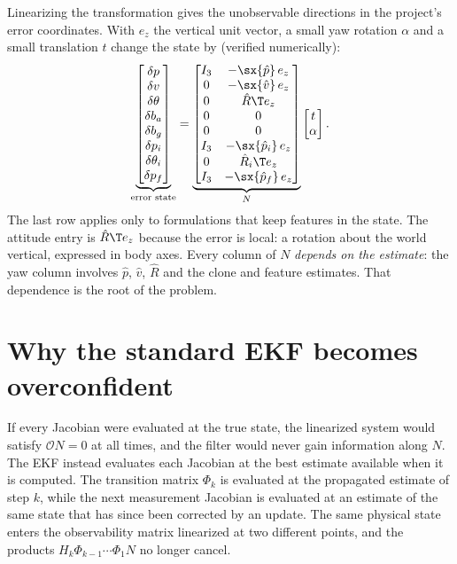 Linearizing the transformation gives the unobservable directions in the project's error coordinates. With $e_z$ the vertical
unit vector, a small yaw rotation $\alpha$ and a small translation $t$ change the state by (verified numerically):
\begin{equation}
  \underbrace{\begin{bmatrix} \delta p \\ \delta v \\ \delta\theta \\ \delta b_a \\ \delta b_g \\ \delta p_i \\ \delta\theta_i \\ \delta p_f \end{bmatrix}}_{\text{error state}}
  = \underbrace{\begin{bmatrix}
    I_3 & -\sx{\hat p}\,e_z \\
    0 & -\sx{\hat v}\,e_z \\
    0 & \hat R\T e_z \\
    0 & 0 \\
    0 & 0 \\
    I_3 & -\sx{\hat p_i}\,e_z \\
    0 & \hat R_i\T e_z \\
    I_3 & -\sx{\hat p_f}\,e_z
  \end{bmatrix}}_{N}
  \begin{bmatrix} t \\ \alpha \end{bmatrix}.
  \label{eq:nullspace-N}
\end{equation}
The last row applies only to formulations that keep features in the state. The attitude entry is $\hat R\T e_z$ because the error is
local: a rotation about the world vertical, expressed in body axes. Every column of $N$ \emph{depends on the estimate}: the yaw
column involves $\hat p$, $\hat v$, $\hat R$ and the clone and feature estimates. That dependence is the root of the problem.

\section{Why the standard EKF becomes overconfident}

If every Jacobian were evaluated at the true state, the linearized system would satisfy $\mathcal{O}N = 0$ at all times, and the
filter would never gain information along $N$. The EKF instead evaluates each Jacobian at the best estimate available when it is
computed. The transition matrix $\Phi_k$ is evaluated at the propagated estimate of step $k$, while the next measurement Jacobian is
evaluated at an estimate of the same state that has since been corrected by an update. The same physical state enters the
observability matrix linearized at two different points, and the products $H_{k}\Phi_{k-1}\cdots\Phi_1 N$ no longer cancel.

